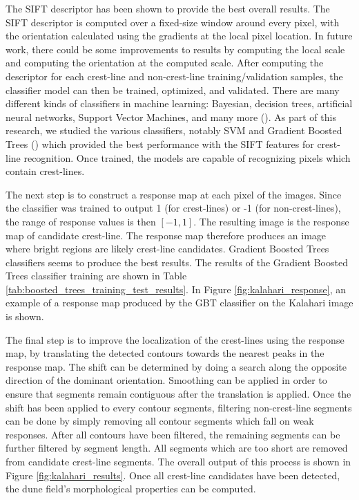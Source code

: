 The SIFT descriptor has been shown to provide the best overall results. The SIFT descriptor is computed over a fixed-size window around every pixel, with the orientation calculated using the gradients at the local pixel location. In future work, there could be some improvements to results by computing the local scale and computing the orientation at the computed scale. After computing the descriptor for each crest-line and non-crest-line training/validation samples, the classifier model can then be trained, optimized, and validated. There are many different kinds of classifiers in machine learning: Bayesian, decision trees, artificial neural networks, Support Vector Machines, and many more (\cite{book_artificial_intelligence_modern_approach,2003_tackling_poor_assumptions_naive_bayes,1987_simplifying_decision_trees,1943_logical_calculus_ideas_immanent_nervous_activity,book_organization_of_behavior,1975_beyond_regression_prediction_analysis,1995_support_vector_networks,1995_support_vector_clustering}). As part of this research, we studied the various classifiers, notably SVM and Gradient Boosted Trees (\cite{1999_gradient_boosting_machine,1999_stochastic_gradient_boosting}) which provided the best performance with the SIFT features for crest-line recognition. Once trained, the models are capable of recognizing pixels which contain crest-lines.

The next step is to construct a response map at each pixel of the images. Since the classifier was trained to output 1 (for crest-lines) or -1 (for non-crest-lines), the range of response values is then $[-1, 1]$. The resulting image is the response map of candidate crest-line. The response map therefore produces an image where bright regions are likely crest-line candidates. Gradient Boosted Trees classifiers seems to produce the best results. The results of the Gradient Boosted Trees classifier training are shown in Table \ref{tab:boosted_trees_training_test_results}. In Figure \ref{fig:kalahari_response}, an example of a response map produced by the GBT classifier on the Kalahari image is shown.

The final step is to improve the localization of the crest-lines using the response map, by translating the detected contours towards the nearest peaks in the response map. The shift can be determined by doing a search along the opposite direction of the dominant orientation. Smoothing can be applied in order to ensure that segments remain contiguous after the translation is applied. Once the shift has been applied to every contour segments, filtering non-crest-line segments can be done by simply removing all contour segments which fall on weak responses. After all contours have been filtered, the remaining segments can be further filtered by segment length. All segments which are too short are removed from candidate crest-line segments. The overall output of this process is shown in Figure \ref{fig:kalahari_results}. Once all crest-line candidates have been detected, the dune field's morphological properties can be computed.


